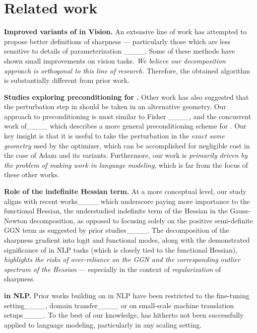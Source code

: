 \section{Related work}
\textbf{Improved variants of \SAM in Vision.} An extensive line of work has attempted to propose better definitions of sharpness --- particularly those which are less sensitive to
details of parameterization
____. Some of these methods 
have shown small improvements on vision tasks. \textit{We believe our decomposition approach is orthogonal to this line of research.} Therefore, the obtained \funcSAM algorithm is substantially different from  prior work.



\textbf{Studies exploring preconditioning for \SAM.} Other work has also suggested that the perturbation step in \SAM should be taken in an alternative geometry. Our approach to preconditioning is most
similar to Fisher \SAM____, and the concurrent work of____ which describes a more
general preconditioning scheme for \SAM. Our key insight is that it is useful to take the \SAM perturbation in the \emph{exact same geometry}
used by the optimizer, which can be accomplished for negligible cost in the case of Adam and its variants.
Furthermore, our work is \textit{primarily driven by the problem of making \SAM work in language modeling}, which is far from the focus of these other works.

\textbf{Role of the indefinite Hessian term.} At a more conceptual level, our study aligns with recent works____ which underscore paying more importance to the functional Hessian, the understudied indefinite term of the Hessian in the Gauss-Newton decomposition, as opposed to focusing solely on the positive semi-definite GGN term as suggested by prior studies____. The decomposition of the sharpness gradient into logit and functional modes, along with the demonstrated significance of \funcSAM in NLP tasks (which is closely tied to the functional Hessian),\textit{ highlights the risks of over-reliance on the GGN and the corresponding outlier spectrum of the Hessian} --- 
especially in the context of \emph{regularization} of sharpness.

\textbf{\SAM in NLP.} Prior works building on \SAM in NLP have been restricted to the fine-tuning setting____, domain transfer____ or on small-scale machine translation setups____.
To the best of our knowledge, \SAM has hitherto not been successfully applied to language modeling, particularly in any scaling
setting.